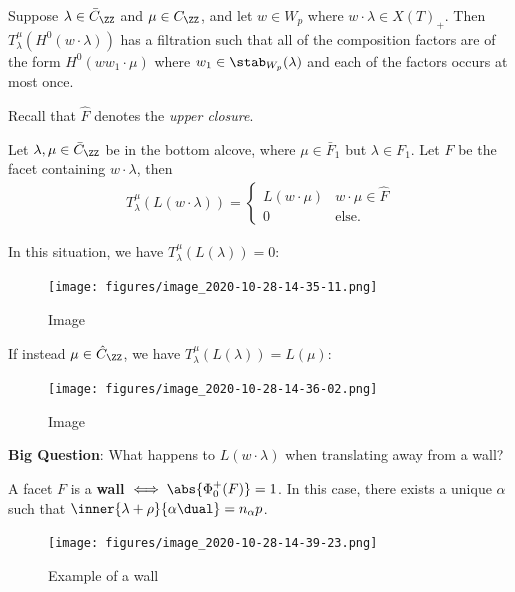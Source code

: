\begin{proposition}[?]

Suppose \(\lambda \in \bar{C}_\ZZ\) and \(\mu \in C_\ZZ\), and let
\(w\in W_p\) where \(w\cdot \lambda \in X(T)_+\). Then
\(T_\lambda^\mu (H^0(w\cdot \lambda))\) has a filtration such that all
of the composition factors are of the form \(H^0(ww_1 \cdot \mu)\) where
\(w_1\in \stab_{W_p}(\lambda)\) and each of the factors occurs at most
once.

\end{proposition}

Recall that \(\hat F\) denotes the \emph{upper closure}.

\begin{proposition}[?]

Let \(\lambda, \mu \in \bar{C}_\ZZ\) be in the bottom alcove, where
\(\mu \in \bar{F}_1\) but \(\lambda\in F_1\). Let \(F\) be the facet
containing \(w\cdot\lambda\), then
\begin{align*}  
T_\lambda^\mu(L(w\cdot \lambda)) = 
\begin{cases}
L(w\cdot \mu)  & w\cdot \mu \in \hat{F} \\
0 & \text{else}.
\end{cases}
\end{align*}

\end{proposition}

\begin{example}[?]

In this situation, we have \(T_\lambda^\mu(L(\lambda)) = 0\):

\begin{figure}
\centering
\texttt{[image: figures/image\_2020-10-28-14-35-11.png]}
\caption{Image}
\end{figure}

If instead \(\mu \in \hat{C}_\ZZ\), we have
\(T_\lambda^\mu( L(\lambda)) = L(\mu)\):

\begin{figure}
\centering
\texttt{[image: figures/image\_2020-10-28-14-36-02.png]}
\caption{Image}
\end{figure}

\end{example}

\textbf{Big Question}: What happens to \(L(w\cdot \lambda)\) when
translating away from a wall?

\begin{definition}[Walls]

A facet \(F\) is a \textbf{wall} \(\iff \abs{ \Phi_0^+(F) } = 1\). In
this case, there exists a unique \(\alpha\) such that
\(\inner{\lambda + \rho}{\alpha\dual} = n_\alpha p\).

\begin{figure}
\centering
\texttt{[image: figures/image\_2020-10-28-14-39-23.png]}
\caption{Example of a wall}
\end{figure}

\end{definition}

